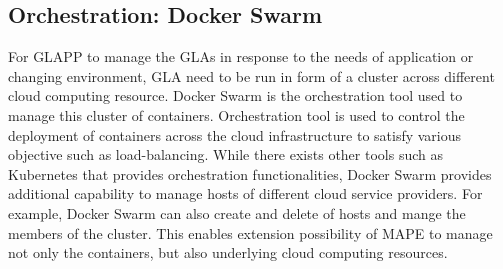 \documentclass{seal_thesis}
\begin{document}
\subsection{Orchestration: Docker Swarm}
For GLAPP to manage the GLAs in response to the needs of application or changing environment, GLA need to be run in form of a cluster across different cloud computing resource.
Docker Swarm is the orchestration tool used to manage this cluster of containers.
Orchestration tool is used to control the deployment of containers across the cloud infrastructure to satisfy various objective such as load-balancing.
While there exists other tools such as Kubernetes that provides orchestration functionalities, Docker Swarm provides additional capability to manage hosts of different cloud service providers.
For example, Docker Swarm can also create and delete of hosts and mange the members of the cluster.
This enables extension possibility of MAPE to manage not only the containers, but also underlying cloud computing resources.
\end{document}
